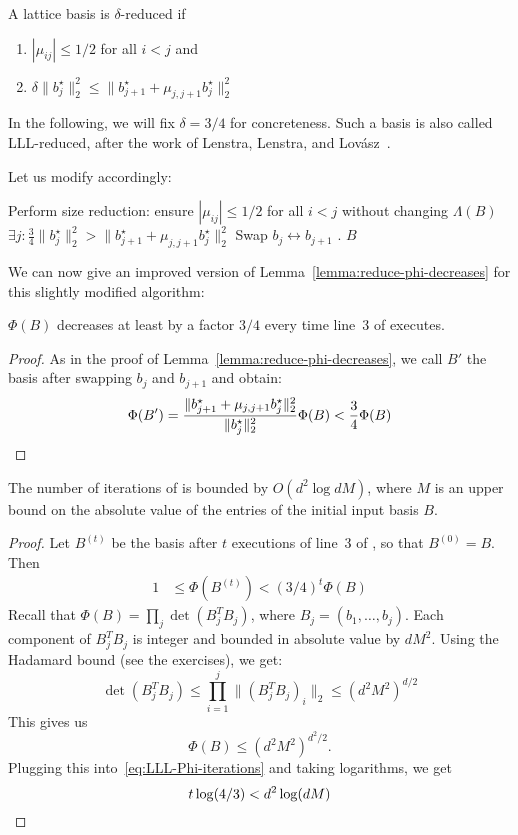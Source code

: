 \begin{definition}
  A lattice basis is $\delta$-reduced if
  \begin{enumerate}
    \item $|\mu_{ij}| \leq 1/2$ for all $i < j$ and
    \item $\delta \|b_j^\star\|_2^2 \leq \|b_{j+1}^\star + \mu_{j,j+1} b_j^\star\|_2^2$
  \end{enumerate}
\end{definition}
In the following, we will fix $\delta = 3/4$ for concreteness.
Such a basis is also called LLL-reduced,
after the work of Lenstra, Lenstra, and Lovász~\cite{MR682664}.

Let us modify  accordingly:
\begin{codebox}
  \li Perform size reduction: ensure $|\mu_{ij}| \leq 1/2$ for all $i < j$ without changing $\Lambda(B)$
  \li \If $\exists j: \frac{3}{4} \|b_j^\star\|_2^2 > \|b_{j+1}^\star + \mu_{j,j+1} b_j^\star\|_2^2$
  \li \Then Swap $b_j \leftrightarrow b_{j+1}$
  \li       {}.
      \End
  \li \Return $B$
\end{codebox}

We can now give an improved version of Lemma~\ref{lemma:reduce-phi-decreases} for this slightly modified algorithm:

\begin{lemma}
  \label{lemma:lll-reduce-phi-decreases}
  $\Phi(B)$ decreases at least by a factor $3/4$ every time line~3 of  executes.
\end{lemma}
\begin{proof}
  As in the proof of Lemma~\ref{lemma:reduce-phi-decreases},
  we call $B'$ the basis after swapping $b_j$ and $b_{j+1}$ and obtain:
  \[
    \Phi(B') = \frac{\|b_{j+1}^\star + \mu_{j,j+1} b_j^\star\|_2^2}{\|b_j^\star\|_2^2} \Phi(B) < \frac{3}{4} \Phi(B) \qedhere
  \]
\end{proof}

\begin{lemma}
  \label{lemma:lll-iterations}
  The number of iterations of  is bounded by $O(d^2 \log dM)$,
  where $M$ is an upper bound on the absolute value of the entries of the initial input basis $B$.
\end{lemma}
\begin{proof}
  Let $B^{(t)}$ be the basis after $t$ executions of line~3 of , so that $B^{(0)} = B$.
  Then
  \begin{align}
    \label{eq:LLL-Phi-iterations}
    1 &\leq \Phi(B^{(t)}) < (3/4)^t \Phi(B)
  \end{align}
  Recall that $\Phi(B) = \prod_j \det(B_j^T B_j)$,
  where $B_j = (b_1, \ldots, b_j)$.
  Each component of $B_j^T B_j$ is integer and bounded in absolute value by $dM^2$.
  Using the Hadamard bound (see the exercises), we get:
  \[
    \det(B_j^T B_j) \leq \prod_{i=1}^j \| (B_j^T B_j)_i \|_2 \leq (d^2M^2)^{d/2}
  \]
  This gives us
  \[
    \Phi(B) \leq (d^2 M^2)^{d^2/2}.
  \]
  Plugging this into~\eqref{eq:LLL-Phi-iterations} and taking logarithms, we get
  \[
    t \log(4/3) < d^2 \log(dM) \qedhere
  \]
\end{proof}

